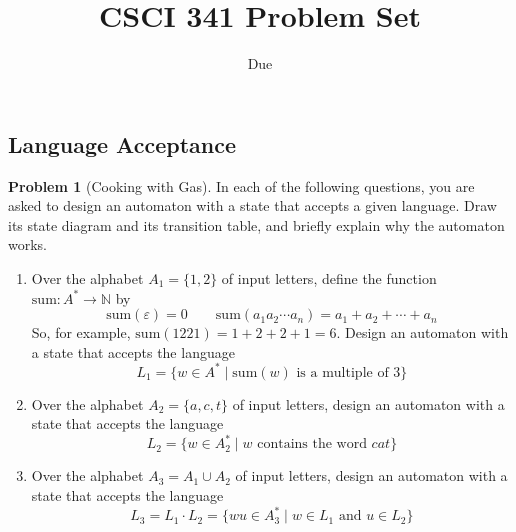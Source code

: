 \documentclass[11pt]{article}
\title{CSCI 341 Problem Set \pset}
\author{\subtitle}
\date{Due
    \duedate
}
\theoremstyle{theorem} %
\theoremstyle{definition} %
\newtheorem{problem}                    {{\color{BurntOrange}Problem}}
\theoremstyle{remark} %
\begin{document}
\maketitle


\subsection*{Language Acceptance}

\begin{problem}
    [Cooking with Gas]
    In each of the following questions, you are asked to design an automaton with a state that accepts a given language.
    Draw its state diagram and its transition table, and briefly explain why the automaton works.
    \begin{enumerate}
        \item Over the alphabet \(A_1 = \{1, 2\}\) of input letters, define the function \(\mathrm{sum} \colon A^* \to \mathbb N\) by
            \[
                \mathrm{sum}(\varepsilon) = 0
                \qquad
                \mathrm{sum}(a_1a_2 \cdots a_n) = a_1 + a_2 + \cdots + a_n
            \]
            So, for example, \(\mathrm{sum}(1221) = 1 + 2 + 2 + 1 = 6\).
            Design an automaton with a state that accepts the language 
            \[
                L_1 = \{w \in A^* \mid \text{\(\mathrm{sum}(w)\) is a multiple of \(3\)} \}
            \]
        
        \item Over the alphabet \(A_2 = \{a, c, t\}\) of input letters, design an automaton with a state that accepts the language 
            \[
                L_2 = \{w \in A_2^* \mid \text{\(w\) contains the word \(cat\)}\}
            \]
        
        \item Over the alphabet \(A_3 = A_1 \cup A_2\) of input letters, design an automaton with a state that accepts the language 
            \[
                L_3 = L_1\cdot L_2 = \{wu \in A_3^* \mid \text{\(w \in L_1\) and \(u \in L_2\)}\}
            \]
    \end{enumerate}
\end{problem}
\end{document}
